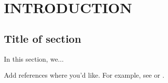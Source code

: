 \chapter{INTRODUCTION} %

\section{Title of section}
In this section, we...  

Add references where you'd like. For example, see \cite{Author} or \cite{Doe}.



